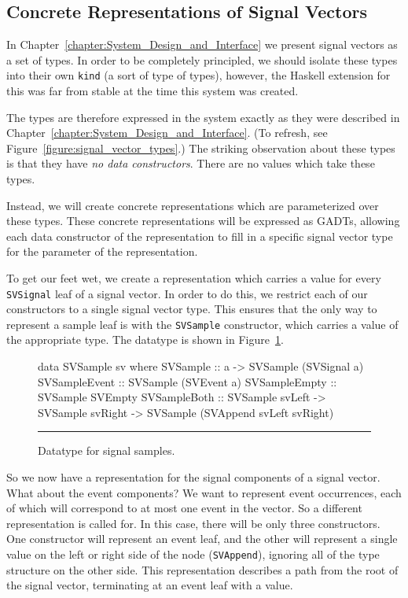 \subsection{Concrete Representations of Signal Vectors}
\label{subsection:Concrete_Representations_of_Signal_Vectors}

In Chapter~\ref{chapter:System_Design_and_Interface} we present signal vectors
as a set of types. In order to be completely principled, we should isolate these
types into their own {\tt kind} (a sort of type of types), however, the Haskell
extension for this was far from stable at the time this system was created.

The types are therefore expressed in the system exactly as they were described
in Chapter~\ref{chapter:System_Design_and_Interface}. (To refresh, see
Figure~\ref{figure:signal_vector_types}.) The striking observation about these
types is that they have {\em no data constructors}. There are no values which
take these types.

Instead, we will create concrete representations which are parameterized over
these types. These concrete representations will be expressed as GADTs, allowing
each data constructor of the representation to fill in a specific signal vector
type for the parameter of the representation.

To get our feet wet, we create a representation which carries a value for
every {\tt SVSignal} leaf of a signal vector. In order to do this, we restrict
each of our constructors to a single signal vector type. This ensures that the
only way to represent a sample leaf is with the {\tt SVSample} constructor,
which carries a value of the appropriate type. The datatype is shown in
Figure~\ref{figure:signal_sample_datatype}.

\begin{figure}
\begin{code}
data SVSample sv where
  SVSample      ::    a
                   -> SVSample (SVSignal a)
  SVSampleEvent ::    SVSample (SVEvent a)
  SVSampleEmpty ::    SVSample SVEmpty
  SVSampleBoth  ::    SVSample svLeft
                   -> SVSample svRight
                   -> SVSample (SVAppend svLeft svRight)
\end{code}
\hrule
\caption{Datatype for signal samples.}
\label{figure:signal_sample_datatype}
\end{figure}

So we now have a representation for the signal components of a signal vector.
What about the event components? We want to represent event occurrences, each
of which will correspond to at most one event in the vector. So a different
representation is called for. In this case, there will be only three
constructors. One constructor will represent an event leaf, and the other will
represent a single value on the left or right side of the node ({\tt SVAppend}),
ignoring all of the type structure on the other side. This representation
describes a path from the root of the signal vector, terminating at an event
leaf with a value.

